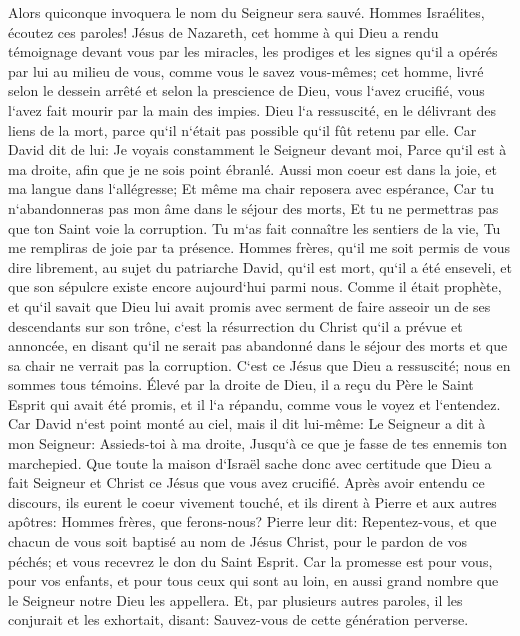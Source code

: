 \verse Alors quiconque invoquera le nom du Seigneur sera sauvé. 
\verse Hommes Israélites, écoutez ces paroles! Jésus de Nazareth, cet homme à qui Dieu a rendu témoignage devant vous par les miracles, les prodiges et les signes qu`il a opérés par lui au milieu de vous, comme vous le savez vous-mêmes; 
\verse cet homme, livré selon le dessein arrêté et selon la prescience de Dieu, vous l`avez crucifié, vous l`avez fait mourir par la main des impies. 
\verse Dieu l`a ressuscité, en le délivrant des liens de la mort, parce qu`il n`était pas possible qu`il fût retenu par elle. 
\verse Car David dit de lui: Je voyais constamment le Seigneur devant moi, Parce qu`il est à ma droite, afin que je ne sois point ébranlé. 
\verse Aussi mon coeur est dans la joie, et ma langue dans l`allégresse; Et même ma chair reposera avec espérance, 
\verse Car tu n`abandonneras pas mon âme dans le séjour des morts, Et tu ne permettras pas que ton Saint voie la corruption. 
\verse Tu m`as fait connaître les sentiers de la vie, Tu me rempliras de joie par ta présence. 
\verse Hommes frères, qu`il me soit permis de vous dire librement, au sujet du patriarche David, qu`il est mort, qu`il a été enseveli, et que son sépulcre existe encore aujourd`hui parmi nous. 
\verse Comme il était prophète, et qu`il savait que Dieu lui avait promis avec serment de faire asseoir un de ses descendants sur son trône, 
\verse c`est la résurrection du Christ qu`il a prévue et annoncée, en disant qu`il ne serait pas abandonné dans le séjour des morts et que sa chair ne verrait pas la corruption. 
\verse C`est ce Jésus que Dieu a ressuscité; nous en sommes tous témoins. 
\verse Élevé par la droite de Dieu, il a reçu du Père le Saint Esprit qui avait été promis, et il l`a répandu, comme vous le voyez et l`entendez. 
\verse Car David n`est point monté au ciel, mais il dit lui-même: Le Seigneur a dit à mon Seigneur: Assieds-toi à ma droite, 
\verse Jusqu`à ce que je fasse de tes ennemis ton marchepied. 
\verse Que toute la maison d`Israël sache donc avec certitude que Dieu a fait Seigneur et Christ ce Jésus que vous avez crucifié. 
\verse Après avoir entendu ce discours, ils eurent le coeur vivement touché, et ils dirent à Pierre et aux autres apôtres: Hommes frères, que ferons-nous? 
\verse Pierre leur dit: Repentez-vous, et que chacun de vous soit baptisé au nom de Jésus Christ, pour le pardon de vos péchés; et vous recevrez le don du Saint Esprit. 
\verse Car la promesse est pour vous, pour vos enfants, et pour tous ceux qui sont au loin, en aussi grand nombre que le Seigneur notre Dieu les appellera. 
\verse Et, par plusieurs autres paroles, il les conjurait et les exhortait, disant: Sauvez-vous de cette génération perverse. 
